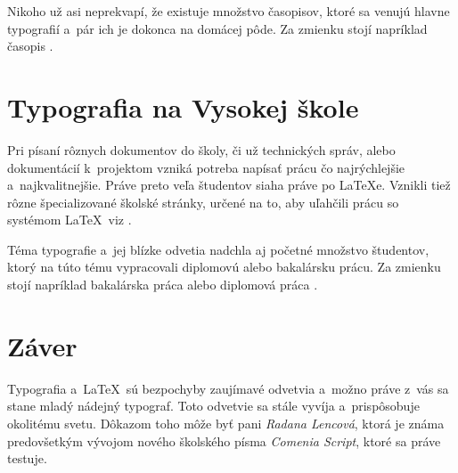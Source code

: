 \documentclass[11pt,a4paper,titlepage]{article}
\begin{document}
Nikoho už asi neprekvapí, že existuje množstvo časopisov, ktoré sa venujú hlavne typografií a~pár ich je dokonca na domácej pôde. Za zmienku stojí napríklad časopis \cite{Typo}.

\section{Typografia na Vysokej škole}
Pri písaní rôznych dokumentov do školy, či už technických správ, alebo dokumentácií k~projektom vzniká potreba napísať prácu čo najrýchlejšie a~najkvalitnejšie. Práve preto veľa študentov siaha práve po \LaTeX e. Vznikli tiež rôzne špecializované školské stránky, určené na to, aby uľahčili prácu so systémom \LaTeX \ viz \cite{Fekt}.

Téma typografie a~jej blízke odvetia nadchla aj početné množstvo študentov, ktorý na túto tému vypracovali diplomovú alebo bakalársku prácu. Za zmienku stojí napríklad bakalárska práca \cite{2d/3d} alebo diplomová práca \cite{Zivyfont}.

\section{Záver}
Typografia a~\LaTeX \ sú bezpochyby zaujímavé odvetvia a~možno práve z~vás sa stane mladý nádejný typograf. Toto odvetvie sa stále vyvíja a~prispôsobuje okolitému svetu. Dôkazom toho môže byť pani \textit{Radana Lencová}, ktorá je známa predovšetkým vývojom nového školského písma \textit{Comenia Script}, ktoré sa práve testuje. \cite{Typor}

\newpage
\renewcommand{\refname}{Referencie}

\end{document}
